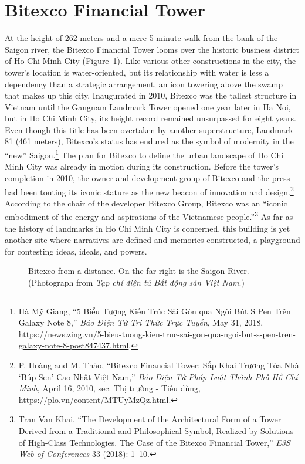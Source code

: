 \section{Bitexco Financial Tower}
At the height of 262 meters and a mere 5-minute walk from the bank of the Saigon river, the Bitexco Financial Tower looms over the historic business district of Ho Chi Minh City (Figure~\ref{bitexco}). Like various other constructions in the city, the tower's location is water-oriented, but its relationship with water is less a dependency than a strategic arrangement, an icon towering above the swamp that makes up this city. Inaugurated in 2010, Bitexco was the tallest structure in Vietnam until the Gangnam Landmark Tower opened one year later in Ha Noi, but in Ho Chi Minh City, its height record remained unsurpassed for eight years. Even though this title has been overtaken by another superstructure, Landmark 81 (461 meters), Bitexco’s status has endured as the symbol of modernity in the “new” Saigon.\footnote{Hà Mỹ Giang, “5 Biểu Tượng Kiến Trúc Sài Gòn qua Ngòi Bút S Pen Trên Galaxy Note 8,” \textit{Báo Điện Tử Tri Thức Trực Tuyến}, May 31, 2018, \url{https://news.zing.vn/5-bieu-tuong-kien-truc-sai-gon-qua-ngoi-but-s-pen-tren-galaxy-note-8-post847437.html}.} The plan for Bitexco to define the urban landscape of Ho Chi Minh City was already in motion during its construction. Before the tower’s completion in 2010, the owner and development group of Bitexco and the press had been touting its iconic stature as the new beacon of innovation and design.\footnote{P. Hoàng and M. Thảo, “Bitexco Financial Tower: Sắp Khai Trương Tòa Nhà ‘Búp Sen’ Cao Nhất Việt Nam,” \textit{Báo Điện Tử Pháp Luật Thành Phố Hồ Chí Minh}, April 16, 2010, sec. Thị trường - Tiêu dùng, \url{https://plo.vn/content/MTUyMzQz.html}.} According to the chair of the developer Bitexco Group, Bitexco was an “iconic embodiment of the energy and aspirations of the Vietnamese people.”\footnote{Tran Van Khai, “The Development of the Architectural Form of a Tower Derived from a Traditional and Philosophical Symbol, Realized by Solutions of High-Class Technologies. The Case of the Bitexco Financial Tower,” \textit{E3S Web of Conferences} 33 (2018): 1–10.}  As far as the history of landmarks in Ho Chi Minh City is concerned, this building is yet another site where narratives are defined and memories constructed, a playground for contesting ideas, ideals, and powers.
\en

\begin{figure}[!ht]
\begin{center}
\vspace{-.2 in}
\caption[Bitexco from a distance]{\vi Bitexco from a distance. On the far right is the Saigon River. (Photograph from \textit{Tạp chí điện tử Bất động sản Việt Nam}.\footnotemark)}\label{bitexco}
\end{center}
\vspace{-.3 in}
\end{figure}

